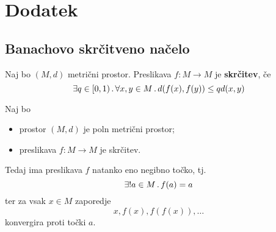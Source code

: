 \section{Dodatek}
\subsection{Banachovo skrčitveno načelo}
\begin{definicija}
    Naj bo \((M, d)\) metrični prostor. Preslikava \(f: M \to M\) je \textbf{skrčitev}, če 
    \[
        \exists q \in [0, 1) \,.\, \forall x, y \in M \,.\, d(f(x), f(y)) \leq qd(x, y)
    \]
\end{definicija}

\begin{izrek}
    \label{izr:banachovo-skrcitveno-nacelo}
    Naj bo 
    \begin{itemize}
        \item prostor \((M, d)\) je poln metrični prostor;
        \item preslikava \(f: M \to M\) je skrčitev.
    \end{itemize}
    Tedaj ima preslikava \(f\) natanko eno negibno točko, tj.
    \[\exists! a \in M \,.\, f(a) = a\]
    ter za vsak \(x \in M\) zaporedje 
    \[
        x, f(x), f(f(x)), \ldots
    \]
    konvergira proti točki \(a\).
\end{izrek}